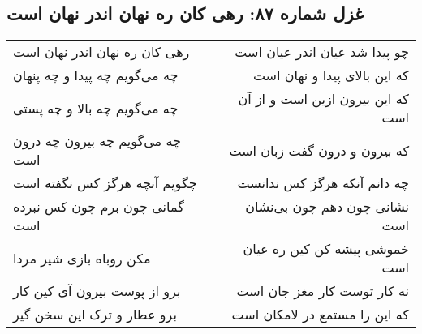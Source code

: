 \begin{center}
\section*{غزل شماره ۸۷: رهی کان ره نهان اندر نهان است}
\label{sec:087}
\begin{longtable}{l p{0.5cm} r}
رهی کان ره نهان اندر نهان است
&&
چو پیدا شد عیان اندر عیان است
\\
چه می‌گویم چه پیدا و چه پنهان
&&
که این بالای پیدا و نهان است
\\
چه می‌گویم چه بالا و چه پستی
&&
که این بیرون ازین است و از آن است
\\
چه می‌گویم چه بیرون چه درون است
&&
که بیرون و درون گفت زبان است
\\
چگویم آنچه هرگز کس نگفته است
&&
چه دانم آنکه هرگز کس ندانست
\\
گمانی چون برم چون کس نبرده است
&&
نشانی چون دهم چون بی‌نشان است
\\
مکن روباه بازی شیر مردا
&&
خموشی پیشه کن کین ره عیان است
\\
برو از پوست بیرون آی کین کار
&&
نه کار توست کار مغز جان است
\\
برو عطار و ترک این سخن گیر
&&
که این را مستمع در لامکان است
\\
\end{longtable}
\end{center}
